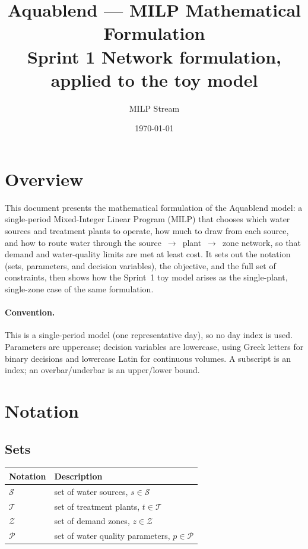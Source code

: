\documentclass[10pt]{article}
\title{\textbf{Aquablend --- MILP Mathematical Formulation}\\[0.3em]
\large Sprint 1 \quad Network formulation, applied to the toy model}
\author{MILP Stream}
\date{\today}
\begin{document}
\maketitle
\section{Overview}
This document presents the mathematical formulation of the Aquablend model: a single-period Mixed-Integer Linear Program (MILP) that chooses which water sources and treatment plants to operate, how much to draw from each source, and how to route water through the source~$\to$~plant~$\to$~zone network, so that demand and water-quality limits are met at least cost.
It sets out the notation (sets, parameters, and decision variables), the objective, and the full set of constraints, then shows how the Sprint~1 toy model arises as the single-plant, single-zone case of the same formulation.

\paragraph{Convention.} This is a single-period model (one representative day), so no day index is used.
Parameters are uppercase; decision variables are lowercase, using Greek letters for binary decisions and lowercase Latin for continuous volumes.
A subscript is an index; an overbar/underbar is an upper/lower bound.


\section{Notation}
\subsection{Sets}
\begin{center}
    \begin{tabular}{@{}ll@{}}
        \toprule
        \textbf{Notation} & \textbf{Description}                                 \\
        \midrule
        $\mathcal{S}$     & set of water sources, $s \in \mathcal{S}$            \\
        $\mathcal{T}$     & set of treatment plants, $t \in \mathcal{T}$         \\
        $\mathcal{Z}$     & set of demand zones, $z \in \mathcal{Z}$             \\
        $\mathcal{P}$     & set of water quality parameters, $p \in \mathcal{P}$ \\
        \bottomrule
    \end{tabular}
\end{center}
\end{document}
